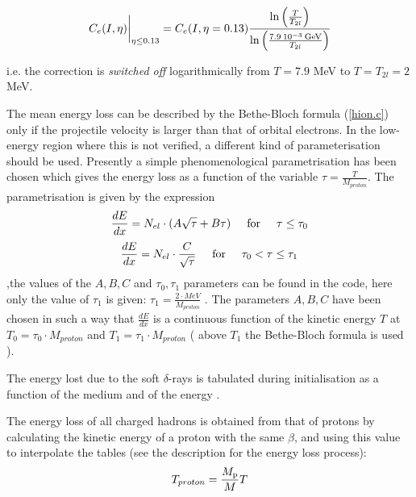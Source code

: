 \[
\left . C_{e}(I,\eta) \rule{0mm}{5mm} \right |_{\eta \leq
0.13} = C_{e}(I,\eta=0.13)\frac{\ln \left ( \frac{T}{T_{2l}} \right )}
{\ln \left ( \frac{7.9 \: 10^{-3} \: \rm GeV}{T_{2l}} \right )}
\]

i.e. the correction is {\it switched off} logarithmically from $T=7.9$
MeV to $T=T_{2l}=2$ MeV.

The mean energy loss can be described by the Bethe-Bloch formula
(\ref{hion.c}) only if the projectile velocity is larger than that
of orbital electrons. In the low-energy region where this is not
verified, a different kind of parameterisation should be used. 
Presently a simple phenomenological parametrisation has been chosen which 
 gives the energy loss as a function of the variable
 $\tau = \frac{T}{M_{proton}}$.
The parametrisation is given by the expression
\begin{equation}
\label{hion.lowen1}
\frac{dE}{dx}  =  N_{el} \cdot (A\sqrt{\tau}+B \tau )  
       \mbox{\hspace{0.5cm}for\hspace{0.5cm}}
        \tau \leq \tau _{0} 
\end{equation}
\begin{equation}
\label{hion.lowen2}
\frac{dE}{dx}  =  N_{el} \cdot \frac{C}{\sqrt{\tau }} 
              \mbox{\hspace{0.5cm}for\hspace{0.5cm}} 
        \tau _{0} < \tau \leq \tau _{1} 
\end{equation}
 ,the values of the $A,B,C$ and $\tau _{0} ,\tau _{1}$ parameters can
be found in the code, here only the value of $\tau _{1}$ is given:
$\tau _{1}= \frac{2 \cdot MeV}{M_{proton}}$ . 
  The parameters $A,B,C$ have been chosen in such a way that  
 $\frac{dE}{dx}$ is a continuous function of the kinetic energy $T$
 at $T_0 =\tau _{0} \cdot M_{proton}$ and $T_1 =\tau _{1} \cdot M_{proton}$  
 ( above $T_1 $ the Bethe-Bloch formula is used ).       


The energy lost due to the soft $\delta$-rays is tabulated during
initialisation as a function of the medium and of the energy .

The energy loss of all charged hadrons
 is obtained from that of protons
by calculating the kinetic energy of a proton with the same
$\beta$, and using this value to interpolate the tables (see the 
description for the energy loss process):
\begin{equation}
 T_{proton} =\frac{M_{\rm p}}{M}T
\end{equation}

